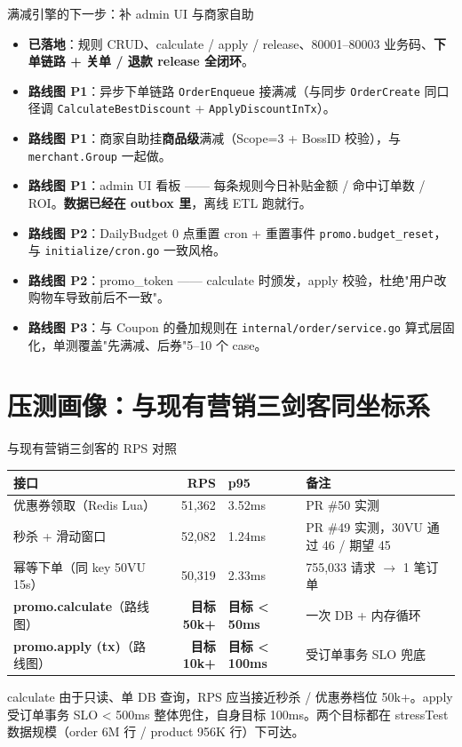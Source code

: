 \documentclass[aspectratio=169,11pt]{beamer}
\begin{document}
\begin{frame}[shrink]{满减引擎的下一步：补 admin UI 与商家自助}
\begin{itemize}
  \item \textbf{已落地}：规则 CRUD、calculate / apply / release、80001--80003 业务码、\textcolor{cOK}{\textbf{下单链路 + 关单 / 退款 release 全闭环}}。
  \item \textbf{路线图 P1}：异步下单链路 \texttt{OrderEnqueue} 接满减（与同步 \texttt{OrderCreate} 同口径调 \texttt{CalculateBestDiscount} + \texttt{ApplyDiscountInTx}）。
  \item \textbf{路线图 P1}：商家自助挂\textbf{商品级}满减（Scope=3 + BossID 校验），与 \texttt{merchant.Group} 一起做。
  \item \textbf{路线图 P1}：admin UI 看板 —— 每条规则今日补贴金额 / 命中订单数 / ROI。\textbf{数据已经在 outbox 里}，离线 ETL 跑就行。
  \item \textbf{路线图 P2}：DailyBudget 0 点重置 cron + 重置事件 \texttt{promo.budget\_reset}，与 \texttt{initialize/cron.go} 一致风格。
  \item \textbf{路线图 P2}：promo\_token —— calculate 时颁发，apply 校验，杜绝"用户改购物车导致前后不一致"。
  \item \textbf{路线图 P3}：与 Coupon 的叠加规则在 \texttt{internal/order/service.go} 算式层固化，单测覆盖"先满减、后券"5--10 个 case。
\end{itemize}
\end{frame}

\section{压测画像：与现有营销三剑客同坐标系}

\begin{frame}[shrink]{与现有营销三剑客的 RPS 对照}
\begin{tabular}{@{}lrll@{}}
\toprule
接口 & RPS & p95 & 备注 \\
\midrule
优惠券领取（Redis Lua）   & 51,362 & 3.52ms & PR \#50 实测 \\
秒杀 + 滑动窗口           & 52,082 & 1.24ms & PR \#49 实测，30VU 通过 46 / 期望 45 \\
幂等下单（同 key 50VU 15s）& 50,319 & 2.33ms & 755,033 请求 $\to$ 1 笔订单 \\
\textbf{promo.calculate}（路线图）& \textbf{目标 50k+} & \textbf{目标 < 50ms} & 一次 DB + 内存循环 \\
\textbf{promo.apply (tx)}（路线图）& \textbf{目标 10k+} & \textbf{目标 < 100ms} & 受订单事务 SLO 兜底 \\
\bottomrule
\end{tabular}
\vspace{2mm}
\small calculate 由于只读、单 DB 查询，RPS 应当接近秒杀 / 优惠券档位 50k+。apply 受订单事务 SLO < 500ms 整体兜住，自身目标 100ms。两个目标都在 stressTest 数据规模（order 6M 行 / product 956K 行）下可达。
\end{frame}
\end{document}
